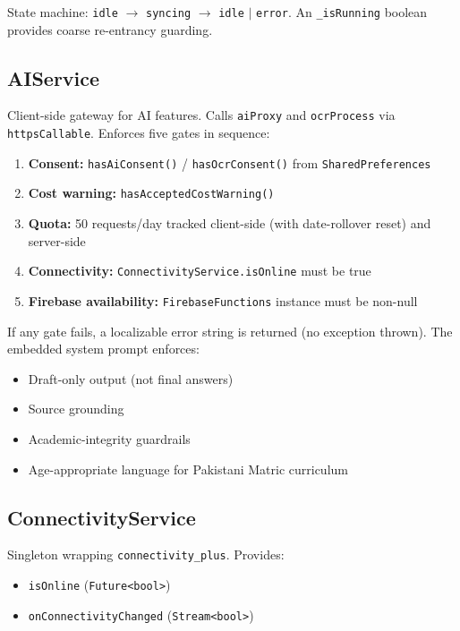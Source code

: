 \documentclass[12pt,a4paper,openany]{report}
\begin{document}
State machine: \texttt{idle} $\to$ \texttt{syncing} $\to$ \texttt{idle} $|$ \texttt{error}. An \texttt{\_isRunning} boolean provides coarse re-entrancy guarding.

\subsection{AIService}

Client-side gateway for AI features. Calls \texttt{aiProxy} and \texttt{ocrProcess} via \texttt{httpsCallable}. Enforces five gates in sequence:

\begin{enumerate}[leftmargin=*]
  \item \textbf{Consent:} \texttt{hasAiConsent()} / \texttt{hasOcrConsent()} from \texttt{SharedPreferences}
  \item \textbf{Cost warning:} \texttt{hasAcceptedCostWarning()}
  \item \textbf{Quota:} 50 requests/day tracked client-side (with date-rollover reset) and server-side
  \item \textbf{Connectivity:} \texttt{ConnectivityService.isOnline} must be true
  \item \textbf{Firebase availability:} \texttt{FirebaseFunctions} instance must be non-null
\end{enumerate}

If any gate fails, a localizable error string is returned (no exception thrown). The embedded system prompt enforces:
\begin{itemize}[leftmargin=*]
  \item Draft-only output (not final answers)
  \item Source grounding
  \item Academic-integrity guardrails
  \item Age-appropriate language for Pakistani Matric curriculum
\end{itemize}

\subsection{ConnectivityService}

Singleton wrapping \texttt{connectivity\_plus}. Provides:
\begin{itemize}[leftmargin=*]
  \item \texttt{isOnline} (\texttt{Future<bool>})
  \item \texttt{onConnectivityChanged} (\texttt{Stream<bool>})
\end{itemize}
\end{document}
